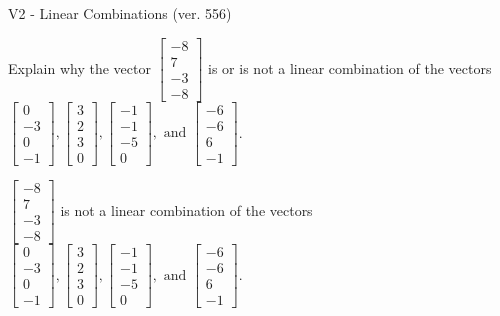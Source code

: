 \begin{exercise}
  \begin{exerciseTitle}V2 - Linear Combinations (ver. 556)\end{exerciseTitle}
  \begin{exerciseStatement}
    Explain why the vector \(\left[\begin{array}{c}
-8 \\
7 \\
-3 \\
-8
\end{array}\right]\)  is or is not a linear 
	combination of the vectors \(\left[\begin{array}{c}
0 \\
-3 \\
0 \\
-1
\end{array}\right] , \left[\begin{array}{c}
3 \\
2 \\
3 \\
0
\end{array}\right] , \left[\begin{array}{c}
-1 \\
-1 \\
-5 \\
0
\end{array}\right] , \text{ and } \left[\begin{array}{c}
-6 \\
-6 \\
6 \\
-1
\end{array}\right]\).
	


  \end{exerciseStatement}
  \begin{exerciseAnswer}
   \(\left[\begin{array}{c}
-8 \\
7 \\
-3 \\
-8
\end{array}\right]\) 
  	 is not  
	a linear combination of the vectors \(\left[\begin{array}{c}
0 \\
-3 \\
0 \\
-1
\end{array}\right] , \left[\begin{array}{c}
3 \\
2 \\
3 \\
0
\end{array}\right] , \left[\begin{array}{c}
-1 \\
-1 \\
-5 \\
0
\end{array}\right] , \text{ and } \left[\begin{array}{c}
-6 \\
-6 \\
6 \\
-1
\end{array}\right]\).


\end{exerciseAnswer}
\end{exercise}
